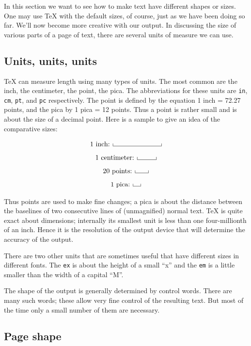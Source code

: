 In this section we want to see how to make text have different 
shapes or sizes.  One may use \TeX{} with the default sizes, of 
course, just as we have been doing so far.  We'll now become more 
creative with our output.  In discussing the size of various 
parts of a page of text, there are several units of measure we 
can use. 

\subsection{Units, units, units} 

\TeX{} can measure length using many types of units.  The most 
common are the inch, the centimeter, the point, the pica. The 
abbreviations for these units are {\tt in}, {\tt cm}, {\tt pt}, 
and {\tt pc} respectively. The point is defined by the equation 1 
inch = 72.27 points, and the pica by 1 pica = 12 points. Thus a 
point is rather small and is about the size of a decimal point. 
Here is a sample to give an idea of the comparative sizes: 
\def\pip{\vrule height 4 true pt } 

$$ \hbox{1 inch: } \hbox to 1 true in{\pip\hrulefill\pip}$$ 
$$ \hbox{1 centimeter: }\hbox to 1 true cm{\pip\hrulefill\pip}$$ 
$$ \hbox{20 points: }\hbox to 20 true pt{\pip\hrulefill\pip}$$ 
$$ \hbox{1 pica: } \hbox to 1 true pc{\pip\hrulefill\pip}$$ 

Thus points are used to make fine changes; a pica is about the 
distance between the baselines of two consecutive lines of 
(unmagnified) normal text.  \TeX{} is quite exact about 
dimensions; internally its smallest unit is less than one 
four-millionth of an inch.  Hence it is the resolution of the 
output device that will determine the accuracy of the output. 

There are two other units that are sometimes useful that have 
different sizes in different fonts. The {\tt ex} is about the 
height of a small ``x'' and the {\tt em} is a little smaller than 
the width of a capital ``M''\null. 

The shape of the output is generally determined by control 
words. There are many such words; these allow very fine control 
of the resulting text.  But most of the time only a small number 
of them are necessary. 

\subsection{Page shape} 

